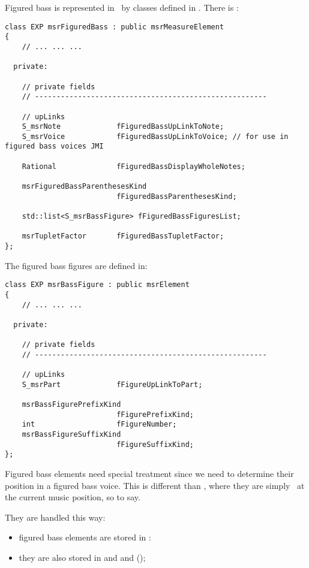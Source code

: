 Figured bass is represented in \msrRepr\ by classes defined in . There is :
\begin{lstlisting}[language=CPlusPlus]
class EXP msrFiguredBass : public msrMeasureElement
{
	// ... ... ...

  private:

    // private fields
    // ------------------------------------------------------

    // upLinks
    S_msrNote             fFiguredBassUpLinkToNote;
    S_msrVoice            fFiguredBassUpLinkToVoice; // for use in figured bass voices JMI

    Rational              fFiguredBassDisplayWholeNotes;

    msrFiguredBassParenthesesKind
                          fFiguredBassParenthesesKind;

    std::list<S_msrBassFigure> fFiguredBassFiguresList;

    msrTupletFactor       fFiguredBassTupletFactor;
};
\end{lstlisting}

The figured bass figures are defined in:
\begin{lstlisting}[language=CPlusPlus]
class EXP msrBassFigure : public msrElement
{
	// ... ... ...

  private:

    // private fields
    // ------------------------------------------------------

    // upLinks
    S_msrPart             fFigureUpLinkToPart;

    msrBassFigurePrefixKind
                          fFigurePrefixKind;
    int                   fFigureNumber;
    msrBassFigureSuffixKind
                          fFigureSuffixKind;
};
\end{lstlisting}

Figured bass elements need special treatment since we need to determine their position in a figured bass voice. This is different than \mxml, where they are simply \drawn\ at the current music position, so to say.

They are handled this way:
\begin{itemize}
\item figured bass elements are stored in :
\item they are also stored in  and  and  (\denorm);
\end{itemize}


